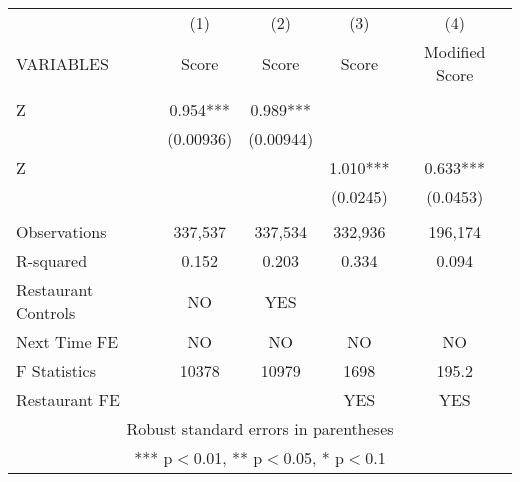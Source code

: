 \begin{tabular}{lcccc} \hline
 & (1) & (2) & (3) & (4) \\
VARIABLES & Score & Score & Score & Modified Score \\ \hline
 &  &  &  &  \\
Z & 0.954*** & 0.989*** &  &  \\
 & (0.00936) & (0.00944) &  &  \\
Z &  &  & 1.010*** & 0.633*** \\
 &  &  & (0.0245) & (0.0453) \\
 &  &  &  &  \\
Observations & 337,537 & 337,534 & 332,936 & 196,174 \\
R-squared & 0.152 & 0.203 & 0.334 & 0.094 \\
Restaurant Controls & NO & YES &  &  \\
Next Time FE & NO & NO & NO & NO \\
F Statistics & 10378 & 10979 & 1698 & 195.2 \\
 Restaurant FE &  &  & YES & YES \\ \hline
\multicolumn{5}{c}{ Robust standard errors in parentheses} \\
\multicolumn{5}{c}{ *** p$<$0.01, ** p$<$0.05, * p$<$0.1} \\
\end{tabular}
